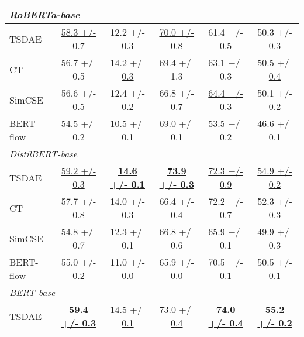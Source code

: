 \documentclass[11pt]{article}
\begin{document}
\begin{table}[H]
{\begin{tabular}{|l|c|c|c|c|c|}
\hline
\multicolumn{6}{|l|}{ \textit{RoBERTa-base} }                                                                                                                              \\ 
\hline
TSDAE     & \uline{58.3 +/- 0.7}          & 12.2 +/- 0.3                  & \uline{70.0 +/- 0.8}          & 61.4 +/- 0.5                  & 50.3 +/- 0.3                   \\
CT        & 56.7 +/- 0.5                  & \uline{14.2 +/- 0.3}          & 69.4 +/- 1.3                  & {63.1 +/- 0.3}          & \uline{50.5 +/- 0.4}           \\
SimCSE & 56.6 +/- 0.5                  & 12.4 +/- 0.2                  & 66.8 +/- 0.7                  & \uline{64.4 +/- 0.3}                  & 50.1 +/- 0.2                   \\ 
BERT-flow & 54.5 +/- 0.2                  & 10.5 +/- 0.1                  & 69.0 +/- 0.1                  & 53.5 +/- 0.2                  & 46.6 +/- 0.1                   \\ 
\hline
\multicolumn{6}{|l|}{ \textit{DistilBERT-base} }                                                                                                                           \\ 
\hline
TSDAE     & \uline{59.2 +/- 0.3}          & \uline{\textbf{14.6 +/- 0.1}} & \uline{\textbf{73.9 +/- 0.3}} & \uline{72.3 +/- 0.9}          & \uline{54.9 +/- 0.2}           \\
CT        & 57.7 +/- 0.8                  & 14.0 +/- 0.3                  & 66.4 +/- 0.4                  & 72.2 +/- 0.7                  & 52.3 +/- 0.3                   \\
SimCSE & 54.8 +/- 0.7                  & 12.3 +/- 0.1                  & 66.8 +/- 0.6                  & 65.9 +/- 0.1                  & 49.9 +/- 0.3                   \\ 
BERT-flow & 55.0 +/- 0.2                  & 11.0 +/- 0.0                  & 65.9 +/- 0.0                  & 70.5 +/- 0.1                  & 50.5 +/- 0.1                   \\ 
\hline
\multicolumn{6}{|l|}{ \textit{BERT-base} }                                                                                                                                 \\ 
\hline
TSDAE     & \uline{\textbf{59.4 +/- 0.3}} & \uline{14.5 +/- 0.1}          & \uline{73.0 +/- 0.4}          & \uline{\textbf{74.0 +/- 0.4}} & \uline{\textbf{55.2 +/- 0.2}}  \\

\end{tabular}}
\end{table}
\end{document}
